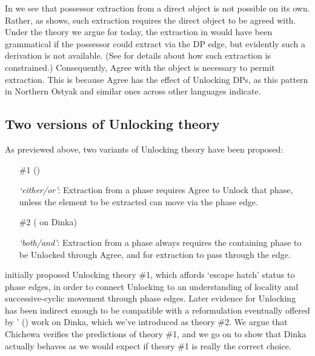\documentclass[output=paper,colorlinks,citecolor=brown]{langscibook}
\begin{document}
In  we see that possessor extraction from a direct object is not possible on its own. Rather, as  shows, such extraction requires the direct object to be agreed with. Under the theory we argue for today, the extraction in  would have been grammatical if the possessor could extract via the DP edge, but evidently such a derivation is not available. (See \citealt{Branan2018} for details about how such extraction is constrained.) Consequently, Agree with the object is necessary to permit extraction. This is because Agree has the effect of Unlocking DPs, as this pattern in Northern Ostyak and similar ones across other languages indicate.

\subsection{Two versions of Unlocking theory}\label{sec:branan:2.3}

As previewed above, two variants of Unlocking theory have been proposed:

\begin{itemize}
	\item[\#1] (\citealt{RackowskiRichards2005, Halpert2016, Halpert2019, Branan2018})

    \textit{`either/or'}: Extraction from a phase requires Agree to Unlock that phase, unless the element to be extracted can move via the phase edge.

    \item[\#2] (\citealt{VanUrkRichards2015} on Dinka)

     \textit{`both/and'}: Extraction from a phase always requires the containing phase to be Unlocked through Agree, and for extraction to pass through the edge.
\end{itemize}

\citeauthor{RackowskiRichards2005} initially proposed Unlocking theory \#1, which affords `escape hatch' status to phase edges, in order to connect Unlocking to an understanding of locality and successive-cyclic movement through phase edges. Later evidence for Unlocking has been indirect enough to be compatible with a reformulation eventually offered by \citeauthor{VanUrkRichards2015}' (\citeyear{VanUrkRichards2015}) work on Dinka, which we've introduced as theory \#2. We argue that Chichewa verifies the predictions of theory $\#$1, and we go on to show that Dinka actually behaves as we would expect if theory \#1 is really the correct choice.
\end{document}
